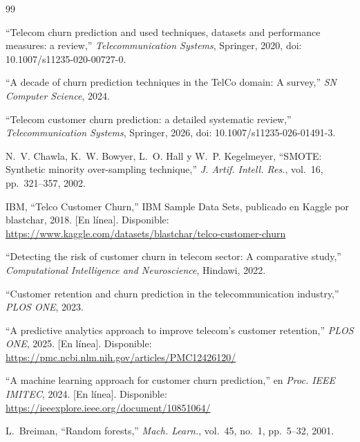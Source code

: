 \documentclass[conference]{IEEEtran}
\begin{document}
\begin{thebibliography}{99}

``Telecom churn prediction and used techniques, datasets and performance measures: a review,'' \emph{Telecommunication Systems}, Springer, 2020, doi: 10.1007/s11235-020-00727-0.

``A decade of churn prediction techniques in the TelCo domain: A survey,'' \emph{SN Computer Science}, 2024.

``Telecom customer churn prediction: a detailed systematic review,'' \emph{Telecommunication Systems}, Springer, 2026, doi: 10.1007/s11235-026-01491-3.

N.~V. Chawla, K.~W. Bowyer, L.~O. Hall y W.~P. Kegelmeyer, ``SMOTE: Synthetic minority over-sampling technique,'' \emph{J. Artif. Intell. Res.}, vol.~16, pp.~321--357, 2002.

IBM, ``Telco Customer Churn,'' IBM Sample Data Sets, publicado en Kaggle por blastchar, 2018. [En línea]. Disponible: \url{https://www.kaggle.com/datasets/blastchar/telco-customer-churn}

``Detecting the risk of customer churn in telecom sector: A comparative study,'' \emph{Computational Intelligence and Neuroscience}, Hindawi, 2022.

``Customer retention and churn prediction in the telecommunication industry,'' \emph{PLOS ONE}, 2023.

``A predictive analytics approach to improve telecom's customer retention,'' \emph{PLOS ONE}, 2025. [En línea]. Disponible: \url{https://pmc.ncbi.nlm.nih.gov/articles/PMC12426120/}

``A machine learning approach for customer churn prediction,'' en \emph{Proc. IEEE IMITEC}, 2024. [En línea]. Disponible: \url{https://ieeexplore.ieee.org/document/10851064/}

L.~Breiman, ``Random forests,'' \emph{Mach. Learn.}, vol.~45, no.~1, pp.~5--32, 2001.


\end{thebibliography}
\end{document}

